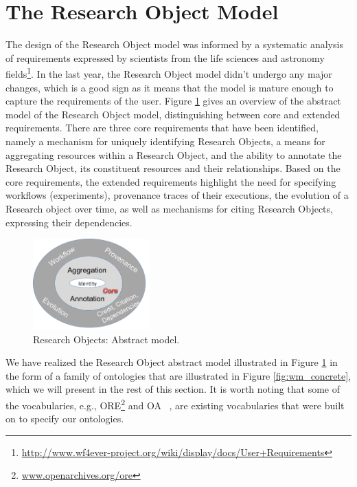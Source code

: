 \section{The Research Object Model}
\label{sec:romodel}

The design of the Research Object model was informed by a systematic analysis of requirements expressed by scientists from the life sciences and astronomy fields\footnote{\url{http://www.wf4ever-project.org/wiki/display/docs/User+Requirements}}. In the last year, the Research Object model didn't undergo any major changes, which is a good sign as it means that the model is mature enough to capture the requirements of the user. Figure \ref{fig:wm_abstract} gives an overview of the abstract model of the Research Object model, distinguishing between core and extended requirements. There are three core requirements that have been identified, namely a mechanism for uniquely identifying Research Objects, a means for aggregating resources within a Research Object, and the ability to annotate the Research Object, its constituent resources and their relationships. Based on the core requirements, the extended requirements highlight the need for specifying workflows (experiments), provenance traces of their executions, the evolution of a Research object over time, as well as mechanisms for citing Research Objects, expressing their dependencies.


\begin{figure}[ht]
  \centering
  \includegraphics[width=0.4\textwidth]{Figures/wm_abstract.png}
  \caption{Research Objects: Abstract model.}
  \label{fig:wm_abstract}
\end{figure}

We have realized the Research Object abstract model illustrated in Figure \ref{fig:wm_abstract} in the form of a family of ontologies that are illustrated in Figure \ref{fig:wm_concrete}, which we will present in the rest of this section.  It is worth noting that some of the vocabularies, e.g., ORE\footnote{\url{www.openarchives.org/ore}} and OA ~\cite{COG11}, are existing vocabularies that were built on to specify our ontologies.

